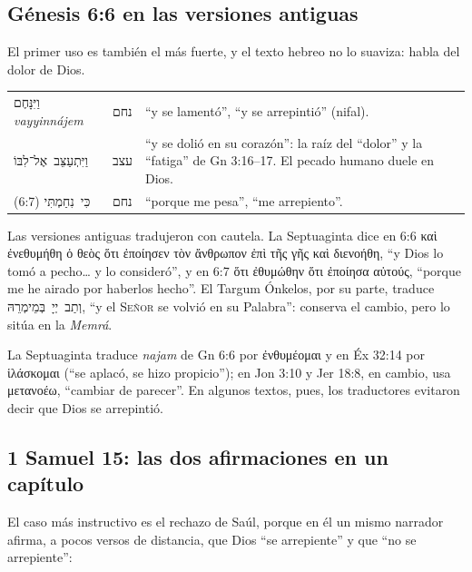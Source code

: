 \documentclass[11pt,letterpaper]{article}
\newcommand{\heb}[1]{\mbox{\foreignlanguage{hebrew}{#1}}}
\newcommand{\grc}[1]{\foreignlanguage{ancientgreek}{#1}}
\newcommand{\SENOR}{\textsc{Señor}}
\begin{document}
\subsection{Génesis 6:6 en las versiones antiguas}
El primer uso es también el más fuerte, y el texto hebreo no lo suaviza: habla del dolor de Dios.

\begin{filologia}[Gn 6:6--7]
\begin{tabular}{@{}L{3.2cm}L{1.6cm}L{10cm}@{}}
\heb{וַיִּנָּחֶם} \emph{vayyinnájem} & \heb{נחם} & ``y se lamentó'', ``y se arrepintió'' (nifal). \\[2pt]
\heb{וַיִּתְעַצֵּב אֶל־לִבּוֹ} & \heb{עצב} & ``y se dolió en su corazón'': la raíz del ``dolor'' y la ``fatiga'' de Gn 3:16--17. El pecado humano duele en Dios. \\[2pt]
\heb{כִּי נִחַמְתִּי} (6:7) & \heb{נחם} & ``porque me pesa'', ``me arrepiento''. \\
\end{tabular}
\end{filologia}

Las versiones antiguas tradujeron con cautela. La Septuaginta dice en 6:6 \grc{καὶ ἐνεθυμήθη ὁ θεὸς ὅτι ἐποίησεν τὸν ἄνθρωπον ἐπὶ τῆς γῆς καὶ διενοήθη}, ``y Dios lo tomó a pecho\ldots{} y lo consideró'', y en 6:7 \grc{ὅτι ἐθυμώθην ὅτι ἐποίησα αὐτούς}, ``porque me he airado por haberlos hecho''. El Targum Ónkelos, por su parte, traduce \heb{וְתַב יְיָ בְּמֵימְרֵהּ}, ``y el \SENOR{} se volvió en su Palabra'': conserva el cambio, pero lo sitúa en la \emph{Memrá}.

\begin{nota}
La Septuaginta traduce \emph{najam} de Gn 6:6 por \grc{ἐνθυμέομαι} y en Éx 32:14 por \grc{ἱλάσκομαι} (``se aplacó, se hizo propicio''); en Jon 3:10 y Jer 18:8, en cambio, usa \grc{μετανοέω}, ``cambiar de parecer''. En algunos textos, pues, los traductores evitaron decir que Dios se arrepintió.
\end{nota}

\subsection{1 Samuel 15: las dos afirmaciones en un capítulo}
El caso más instructivo es el rechazo de Saúl, porque en él un mismo narrador afirma, a pocos versos de distancia, que Dios ``se arrepiente'' y que ``no se arrepiente'':
\end{document}
